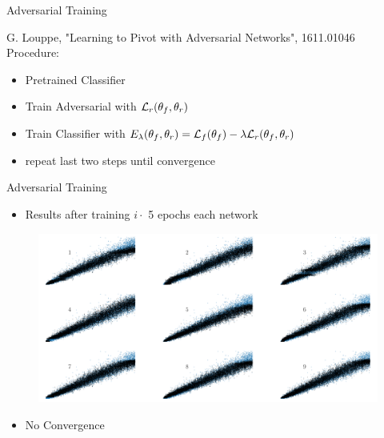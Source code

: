 \documentclass[10pt]{beamer}
\begin{document}
\begin{frame}{Adversarial Training}

    \footnotesize{\color{gray} G. Louppe, "Learning to Pivot with Adversarial Networks", 1611.01046} \\
  Procedure:
  \begin{itemize}
  \item Pretrained Classifier
  \item Train Adversarial with  $ {\cal L}_r(\theta_f, \theta_r)$
  \item Train Classifier with $ E_\lambda(\theta_f, \theta_r) = {\cal L}_f(\theta_f) - \lambda {\cal L}_r(\theta_f, \theta_r)$ 
  \item repeat last two steps until convergence
  \end{itemize}

\end{frame}

\begin{frame}{Adversarial Training}
  \begin{itemize}
  \item Results after training $i \cdot$ 5 epochs each network
  \end{itemize}
  \begin{figure}[hbtp]
    \centering
    \includegraphics[width=.9\linewidth]{../images/adv_scatter.png}
  \end{figure}
  \begin{itemize}
  \item No Convergence
  \end{itemize}
\end{frame}
\end{document}

